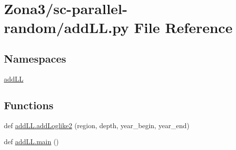 \hypertarget{_zona3_2sc-parallel-random_2add_l_l_8py}{}\section{Zona3/sc-\/parallel-\/random/add\+LL.py File Reference}
\label{_zona3_2sc-parallel-random_2add_l_l_8py}
\subsection*{Namespaces}
\begin{DoxyCompactItemize}
\item 
 \hyperlink{namespaceadd_l_l}{add\+LL}
\end{DoxyCompactItemize}
\subsection*{Functions}
\begin{DoxyCompactItemize}
\item 
def \hyperlink{namespaceadd_l_l_aa96a722d0234136b34ff4a5e5cd181d0}{add\+L\+L.\+add\+Loglike2} (region, depth, year\+\_\+begin, year\+\_\+end)
\item 
def \hyperlink{namespaceadd_l_l_a81cabc4a4a81cb2c54417df2d6eedb3a}{add\+L\+L.\+main} ()
\end{DoxyCompactItemize}

